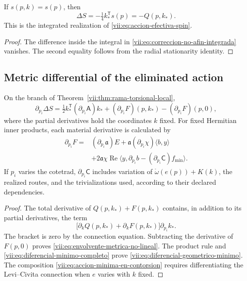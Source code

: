 \begin{corollary}
\label{vii:cor:recuperacion-eliminacion-afin}
If \(s(p,k)=s(p)\), then
\[
 \Delta S=-\tfrac14 k_*^{\mathsf T}s(p)=-Q(p,k_*).
\]
This is the integrated realization of
\eqref{vii:eq:accion-efectiva-spin}.
\end{corollary}
\begin{proof}
The difference inside the integral in
\eqref{vii:eq:correccion-no-afin-integrada} vanishes. The second
equality follows from the radial stationarity identity.
\end{proof}

\subsection{Metric differential of the eliminated action}
\label{vii:subsec:diferencial-metrico-no-lineal}

\begin{theorem}
\label{vii:thm:envolvente-metrica}
On the branch of Theorem~\ref{vii:thm:rama-torsional-local},
\begin{equation}
 \partial_{p_i}\Delta S
 =\tfrac12 k_*^{\mathsf T}(\partial_{p_i}\mathsf A)k_*
  +(\partial_{p_i}F)(p,k_*)-(\partial_{p_i}F)(p,0),
 \label{vii:eq:envolvente-metrica-no-lineal}
\end{equation}
where the partial derivatives hold the coordinates \(k\) fixed.
For fixed Hermitian inner products, each material derivative is calculated by
\begin{equation}
 \begin{split}
 \partial_{p_i}F={}&(\partial_{p_i}\mathfrak a)E
       +\mathfrak a(\partial_{p_i}\chi)\langle b,y\rangle\\
   &+2\mathfrak a\chi\operatorname{Re}
       \langle y,\partial_{p_i}b
                    -(\partial_{p_i}\mathsf C)f_{\min}\rangle.
 \end{split}
 \label{vii:eq:diferencial-geometrico-minimo}
\end{equation}
If \(p_i\) varies the cotetrad, \(\partial_{p_i}\mathsf C\)
includes variation of
\(\mathring\omega(e(p))+K(k)\), the realized routes, and
the trivializations used, according to their declared dependencies.
\end{theorem}

\begin{proof}
The total derivative of \(Q(p,k_*)+F(p,k_*)\) contains, in addition
to its partial derivatives, the term
\[
 \bigl[\partial_kQ(p,k_*)+\partial_kF(p,k_*)\bigr]
                      \partial_{p_i}k_*.
\]
The bracket is zero by the connection equation. Subtracting the derivative
of \(F(p,0)\) proves
\eqref{vii:eq:envolvente-metrica-no-lineal}.
The product rule and
\eqref{vii:eq:diferencial-minimo-completo} prove
\eqref{vii:eq:diferencial-geometrico-minimo}. The composition
\eqref{vii:eq:accion-minima-en-contorsion} requires differentiating
the Levi--Civita connection when \(e\) varies with \(k\) fixed.
\end{proof}

